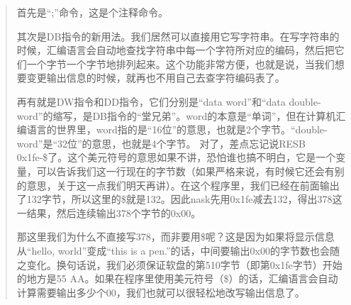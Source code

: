 \begin{quote}
首先是“;”命令，这是个注释命令。

其次是DB指令的新用法。我们居然可以直接用它写字符串。在写字符串的时候，汇编语言会自动地查找字符串中每一个字符所对应的编码，然后把它们一个字节一个字节地排列起来。这个功能非常方便，也就是说，当我们想要变更输出信息的时候，就再也不用自己去查字符编码表了。

再有就是DW指令和DD指令，它们分别是“data word”和“data double-word”的缩写，是DB指令的“堂兄弟”。word的本意是“单词”，但在计算机汇编语言的世界里，word指的是“16位”的意思，也就是2个字节。“double-word”是“32位”的意思，也就是4个字节。
对了，差点忘记说RESB 0x1fe-\$了。这个美元符号的意思如果不讲，恐怕谁也搞不明白，它是一个变量，可以告诉我们这一行现在的字节数（如果严格来说，有时候它还会有别的意思，关于这一点我们明天再讲）。在这个程序里，我们已经在前面输出了132字节，所以这里的\$就是132。因此nask先用0x1fe减去132，得出378这一结果，然后连续输出378个字节的0x00。

那这里我们为什么不直接写378，而非要用\$呢？这是因为如果将显示信息从“hello, world”变成“this is a pen.”的话，中间要输出0x00的字节数也会随之变化。换句话说，我们必须保证软盘的第510字节（即第0x1fe字节）开始的地方是55 AA。如果在程序里使用美元符号（\$）的话，汇编语言会自动计算需要输出多少个00，我们也就可以很轻松地改写输出信息了。
\end{quote}
